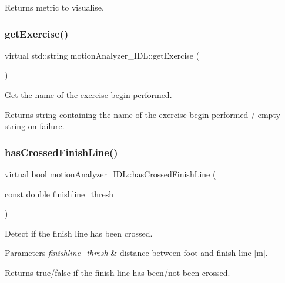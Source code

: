 \begin{DoxyReturn}{Returns}
metric to visualise. 
\end{DoxyReturn}
\mbox{\label{classmotionAnalyzer__IDL_a7e2b015cc7bd121d789e33980505f630}} 
\subsubsection{\texorpdfstring{getExercise()}{getExercise()}}
{\footnotesize\ttfamily virtual std\+::string motion\+Analyzer\+\_\+\+I\+D\+L\+::get\+Exercise (\begin{DoxyParamCaption}{ }\end{DoxyParamCaption})\hspace{0.3cm}{\ttfamily [virtual]}}



Get the name of the exercise begin performed. 

\begin{DoxyReturn}{Returns}
string containing the name of the exercise begin performed / empty string on failure. 
\end{DoxyReturn}
\mbox{\label{classmotionAnalyzer__IDL_a1799aa66881c880c666cd580a5615b33}} 
\subsubsection{\texorpdfstring{hasCrossedFinishLine()}{hasCrossedFinishLine()}}
{\footnotesize\ttfamily virtual bool motion\+Analyzer\+\_\+\+I\+D\+L\+::has\+Crossed\+Finish\+Line (\begin{DoxyParamCaption}\item[{const double}]{finishline\+\_\+thresh }\end{DoxyParamCaption})\hspace{0.3cm}{\ttfamily [virtual]}}



Detect if the finish line has been crossed. 


\begin{DoxyParams}{Parameters}
{\em finishline\+\_\+thresh} & distance between foot and finish line \mbox{[}m\mbox{]}. \\
\hline
\end{DoxyParams}
\begin{DoxyReturn}{Returns}
true/false if the finish line has been/not been crossed. 
\end{DoxyReturn}
\mbox{\label{classmotionAnalyzer__IDL_afbc001ddbf3f499d2ade5681cf0c7f54}} 
